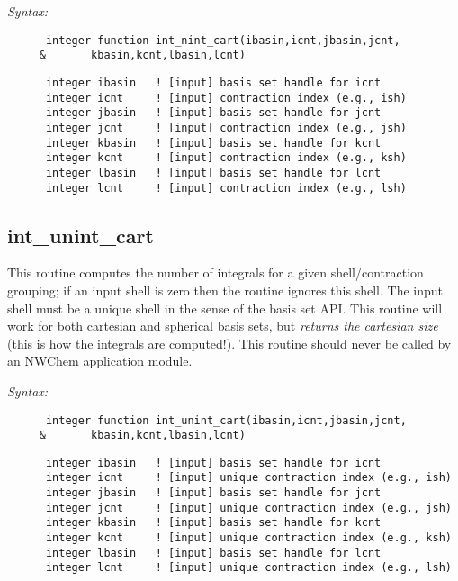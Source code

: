 {\it Syntax:} 
\begin{verbatim} 
      integer function int_nint_cart(ibasin,icnt,jbasin,jcnt, 
     &       kbasin,kcnt,lbasin,lcnt) 
\end{verbatim} 
\begin{verbatim} 
      integer ibasin   ! [input] basis set handle for icnt 
      integer icnt     ! [input] contraction index (e.g., ish) 
      integer jbasin   ! [input] basis set handle for jcnt 
      integer jcnt     ! [input] contraction index (e.g., jsh) 
      integer kbasin   ! [input] basis set handle for kcnt 
      integer kcnt     ! [input] contraction index (e.g., ksh) 
      integer lbasin   ! [input] basis set handle for lcnt 
      integer lcnt     ! [input] contraction index (e.g., lsh) 
\end{verbatim} 
\subsection{int\_unint\_cart} 
This routine computes the number of integrals for a given  
shell/contraction grouping; if an input shell is zero then  
the routine ignores this shell.  The input shell must be a  
unique shell in the sense of the basis set API.  This  
routine will work for both cartesian and spherical basis  
sets, but {\it returns the cartesian size} (this is how the  
integrals are computed!). 
This routine should never be called by an NWChem  
application module. 
 
{\it Syntax:} 
\begin{verbatim} 
      integer function int_unint_cart(ibasin,icnt,jbasin,jcnt, 
     &       kbasin,kcnt,lbasin,lcnt) 
\end{verbatim} 
\begin{verbatim} 
      integer ibasin   ! [input] basis set handle for icnt 
      integer icnt     ! [input] unique contraction index (e.g., ish) 
      integer jbasin   ! [input] basis set handle for jcnt 
      integer jcnt     ! [input] unique contraction index (e.g., jsh) 
      integer kbasin   ! [input] basis set handle for kcnt 
      integer kcnt     ! [input] unique contraction index (e.g., ksh) 
      integer lbasin   ! [input] basis set handle for lcnt 
      integer lcnt     ! [input] unique contraction index (e.g., lsh) 
\end{verbatim} 
